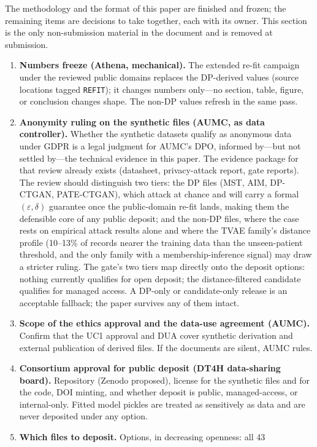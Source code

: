 \documentclass[11pt,a4paper]{article}
\newcommand{\eps}{\ensuremath{\varepsilon}}
\begin{document}
The methodology and the format of this paper are finished and frozen; the
remaining items are decisions to take together, each with its owner. This section
is the only non-submission material in the document and is removed at submission.

\begin{enumerate}
\item \textbf{Numbers freeze (Athena, mechanical).} The extended re-fit campaign
under the reviewed public domains replaces the DP-derived values (source locations
tagged \texttt{REFIT}); it changes numbers only---no section, table, figure, or
conclusion changes shape. The non-DP values refresh in the same pass.
\item \textbf{Anonymity ruling on the synthetic files (AUMC, as data
controller).} Whether the synthetic datasets qualify as anonymous data under GDPR
is a legal judgment for AUMC's DPO, informed by---but not settled by---the
technical evidence in this paper. The evidence package for that review already
exists (datasheet, privacy-attack report, gate reports). The review should
distinguish two tiers: the DP files (MST, AIM, DP-CTGAN,
PATE-CTGAN), which attack at chance and will carry a formal $(\eps, \delta)$
guarantee once the public-domain re-fit lands, making them the defensible core of
any public deposit; and the non-DP files, where the case rests on empirical
attack results alone and where the TVAE family's distance profile (10--13\% of
records nearer the training data than the unseen-patient threshold, and the only
family with a membership-inference signal) may draw a stricter ruling. The gate's
two tiers map directly onto the deposit options: nothing currently qualifies for
open deposit; the distance-filtered candidate qualifies for managed access. A
DP-only or candidate-only release is an acceptable fallback; the paper survives
any of them intact.
\item \textbf{Scope of the ethics approval and the data-use agreement (AUMC).}
Confirm that the UC1 approval and DUA cover synthetic derivation and external
publication of derived files. If the documents are silent, AUMC rules.
\item \textbf{Consortium approval for public deposit (DT4H data-sharing
board).} Repository (Zenodo proposed), license for the synthetic files and for
the code, DOI minting, and whether deposit is public, managed-access, or
internal-only. Fitted model pickles are treated as sensitively as data and are
never deposited under any option.
\item \textbf{Which files to deposit.} Options, in decreasing openness: all 43

\end{enumerate}
\end{document}
